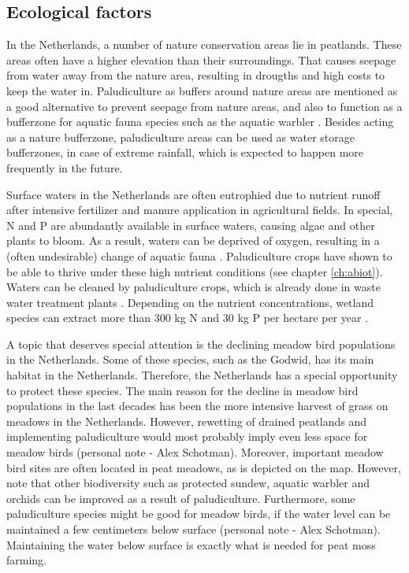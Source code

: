 {\subsection{Ecological factors}
In the Netherlands, a number of nature conservation areas lie in peatlands. These areas often have a higher elevation than their surroundings. That causes seepage from water away from the nature area, resulting in drougths and high costs to keep the water in. Paludiculture as buffers around nature areas are mentioned as a good alternative to prevent seepage from nature areas, and also to function as a bufferzone for aquatic fauna species such as the aquatic warbler \citep{van2013rewetting}. Besides acting as a nature bufferzone, paludiculture areas can be used as water storage bufferzones, in case of extreme rainfall, which is expected to happen more frequently in the future. 

Surface waters in the Netherlands are often eutrophied due to nutrient runoff after intensive fertilizer and manure application in agricultural fields. In special, N and P are abundantly available in surface waters, causing algae and other plants to bloom. As a result, waters can be deprived of oxygen, resulting in a (often undesirable) change of aquatic fauna \citep{waajen2014eutrophic}. Paludiculture crops have shown to be able to thrive under these high nutrient conditions (see chapter \ref{ch:abiot}). Waters can be cleaned by paludiculture crops, which is already done in waste water treatment plants \citep{}. Depending on the nutrient concentrations, wetland species can extract more than 300 kg N and 30 kg P per hectare per year \citep{Land2016}. 

A topic that deserves special attention is the declining meadow bird populations in the Netherlands. Some of these species, such as the Godwid, has its main habitat in the Netherlands. Therefore, the Netherlands has a special opportunity to protect these species. The main reason for the decline in meadow bird populations in the last decades has been the more intensive harvest of grass on meadows in the Netherlands. However, rewetting of drained peatlands and implementing paludiculture would most probably imply even less space for meadow birds (personal note - Alex Schotman). Moreover, important meadow bird sites are often located in peat meadows, as is depicted on the map. However, note that other biodiversity such as protected sundew, aquatic warbler and orchids can be improved as a result of paludiculture. Furthermore, some paludiculture species might be good for meadow birds, if the water level can be maintained a few centimeters below surface (personal note - Alex Schotman). Maintaining the water below surface is exactly what is needed for peat moss farming.

}
